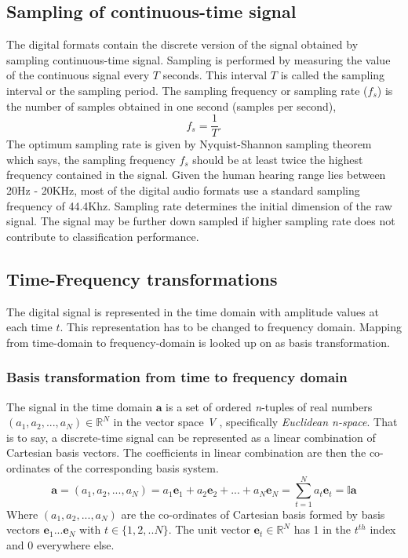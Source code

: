 \subsection{Sampling of continuous-time signal}
\label{sampling}
The digital formats contain the discrete version of the signal obtained by sampling continuous-time signal. Sampling is performed by measuring the value of the continuous signal every $T$ seconds. This interval $T$ is called the sampling interval or the sampling period. The sampling frequency or sampling rate ($f_{s}$) is the number of samples obtained in one second (samples per second),  
\[
 f_{s} = \frac{1}{T}.
\]
The optimum sampling rate is given by Nyquist-Shannon sampling theorem which says, the sampling frequency $f_{s}$ should be at least twice the highest frequency contained in the signal. Given the human hearing range lies between 20Hz - 20KHz, most of the digital audio formats use a standard sampling frequency of 44.4Khz. Sampling rate determines the initial dimension of the raw signal. The signal may be further down sampled if higher sampling rate does not contribute to classification performance.

\subsection{Time-Frequency transformations}
\label{time}
The digital signal is represented in the time domain with amplitude values at each time $t$. This representation has to be changed to frequency domain. Mapping from time-domain to frequency-domain is looked up on as basis transformation. 

\subsubsection{Basis transformation from time to frequency domain}
\noindent The signal in the time domain $\textbf{a}$ is a set of ordered \textit{n}-tuples of real numbers \( (a_{1},a_{2}, ...,a_{N}) \in \mathbb{R}^N \) in the vector space \textit{V} , specifically \textit{Euclidean n-space}. That is to say, a discrete-time signal can be represented as a linear combination of Cartesian basis vectors. The coefficients in linear combination are then the co-ordinates of the corresponding basis system.  
\[
\textbf{a} = (a_{1},a_{2}, ...,a_{N}) = a_{1}\textbf{e}_{1} + a_{2}\textbf{e}_{2} + ... + a_{N}\textbf{e}_{N} = \displaystyle\sum_{t=1}^{N}a_{t}\textbf{e}_{t} = \mathbb{I}\textbf{a}
\]
Where $(a_{1},a_{2}, ...,a_{N})$ are the co-ordinates of Cartesian basis formed by basis vectors $\textbf{e}_{1} ... \textbf{e}_{N}$ with $t \in \{1,2,..N\}$. The unit vector $\textbf{e}_{t} \in \mathbb{R}^{N}$ has 1 in the $t^{th}$ index and 0 everywhere else.
\bigskip

